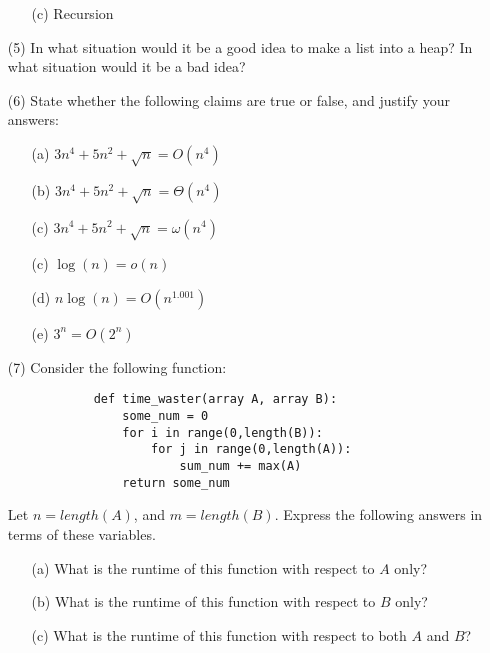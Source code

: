 \documentclass[12pt]{article}
\begin{document}
\begin{enumerate}
\begin{itemize}
            \item[(c)] Recursion  
    \end{itemize}
    \item[(5)] In what situation would it be a good idea to make a list into a heap? In what situation would it be a bad idea? 
    \newpage 
    \item[(6)] State whether the following claims are true or false, and justify your answers:
    \begin{itemize}
        \item[(a)] $3n^4+5n^2+\sqrt{n} = O(n^4)$ \vspace{4cm}
        \item[(b)] $3n^4+5n^2+\sqrt{n} = \Theta(n^4)$ \vspace{4cm}
        \item[(c)] $3n^4+5n^2+\sqrt{n} = \omega(n^4)$ \vspace{4cm}
        \item[(c)] $\log(n) = o(n)$ \vspace{3cm}
        \item[(d)] $n\log(n) = O(n^1.001)$ \vspace{3cm}
        \item[(e)] $3^n = O(2^n)$ \vspace{3cm}
    \end{itemize}
    \newpage
    \item[(7)] Consider the following function:
        \begin{lstlisting}
            def time_waster(array A, array B):
                some_num = 0
                for i in range(0,length(B)):
                    for j in range(0,length(A)):
                        sum_num += max(A)
                return some_num
        \end{lstlisting}
        Let $n = length(A)$, and $m = length(B)$. Express the following answers in terms of these variables.
        \begin{itemize}
            \item[(a)] What is the runtime of this function with respect to $A$ only? \vspace{3cm} %
            \item[(b)] What is the runtime of this function with respect to $B$ only? \vspace{3cm} %
            \item[(c)] What is the runtime of this function with respect to both $A$ and $B$? \vspace{3cm}

\end{itemize}
\end{enumerate}
\end{document}
